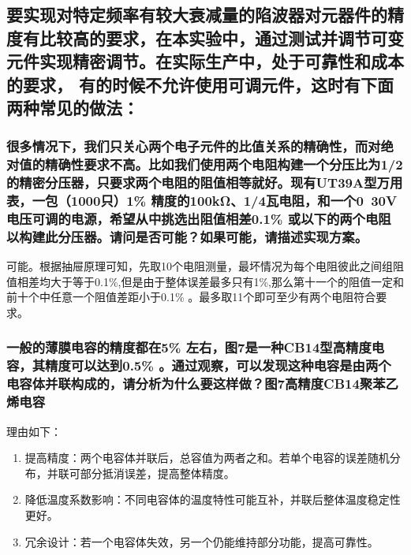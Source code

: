 \documentclass{article}
\begin{document}
\subsection{要实现对特定频率有较大衰减量的陷波器对元器件的精度有比较高的要求，在本实验中，通过测试并调节可变元件实现精密调节。在实际生产中，处于可靠性和成本的要求，
有的时候不允许使用可调元件，这时有下面两种常见的做法：}
\subsubsection{很多情况下，我们只关心两个电子元件的比值关系的精确性，而对绝对值的精确性要求不高。比如我们使用两个电阻构建一个分压比为1/2的精密分压器，只要求两个电阻的阻值相等就好。现有UT39A型万用表，一包（1000只）1\% 精度的100kΩ、1/4瓦电阻，和一个0~30V电压可调的电源，希望从中挑选出阻值相差0.1\% 或以下的两个电阻以构建此分压器。请问是否可能？如果可能，请描述实现方案。}
可能。根据抽屉原理可知，先取10个电阻测量，最坏情况为每个电阻彼此之间组阻值相差均大于等于0.1\%,但是由于整体误差最多只有1\%,那么第十一个的阻值一定和前十个中任意一个阻值差距小于0.1\% 。最多取11个即可至少有两个电阻符合要求。
\subsubsection{一般的薄膜电容的精度都在5\% 左右，图7是一种CB14型高精度电容，其精度可以达到0.5\% 。通过观察，可以发现这种电容是由两个电容体并联构成的，请分析为什么要这样做？图7高精度CB14聚苯乙烯电容}
理由如下：
\begin{enumerate}
    \item 提高精度：两个电容体并联后，总容值为两者之和。若单个电容的误差随机分布，并联可部分抵消误差，提高整体精度。
    \item 降低温度系数影响：不同电容体的温度特性可能互补，并联后整体温度稳定性更好。
    \item 冗余设计：若一个电容体失效，另一个仍能维持部分功能，提高可靠性。
\end{enumerate}
\end{document}
